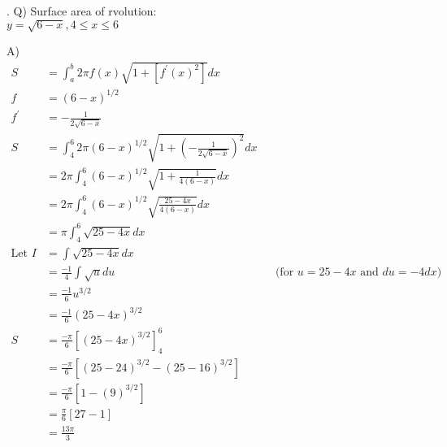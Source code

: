 \documentclass{article}
\newcounter{question}
\begin{document}
\newcommand\Que[1]{%
   \leavevmode\par
   \stepcounter{question}
   \noindent
   \thequestion. Q) #1\par}

\newcommand\Ans[2][]{%
    \leavevmode\par\noindent
   {A) \textbf{#1}#2\par}}

\Que{
    Surface area of rvolution:\\

    $ y = \sqrt{6-x}, 4 \le x \le 6 $\\
    }
\Ans{
    \begin{align*}
        S & = \int_a^b{2\pi f(x) \sqrt{1+[f^{\prime}(x)^2]}} dx\\
        f & = (6-x)^{1/2}\\
        f^{\prime} & = -\frac{1}{2\sqrt{6-x}}\\
        S & = \int_4^6{2\pi 
            (6-x)^{1/2} 
            \sqrt{1+(-\frac{1}{2\sqrt{6-x}})^2}} dx\\
        & = 2\pi \int_4^6{
            (6-x)^{1/2} 
            \sqrt{1+\frac{1}{4(6-x)}}} dx\\
        & = 2\pi \int_4^6{
            (6-x)^{1/2} 
            \sqrt{\frac{25-4x}{4(6-x)}}} dx\\
        & = \pi \int_4^6{ \sqrt{25-4x}} dx\\
        \text{Let } I & = \int{ \sqrt{25-4x} } dx\\
        & = \frac{-1}{4} \int{ \sqrt{u} } du
            && \text{(for $u=25-4x$ and $du=-4dx$)}\\
        & = \frac{-1}{6} u^{3/2}\\
        & = \frac{-1}{6} (25-4x)^{3/2}\\
        S & = \frac{-\pi}{6} \left[
            (25-4x)^{3/2}
        \right ]_4^6\\
        & = \frac{-\pi}{6} \left[
            (25-24)^{3/2} - (25-16)^{3/2}
        \right ]\\
        & = \frac{-\pi}{6} \left[
            1 - (9)^{3/2}
        \right ]\\
        & = \frac{\pi}{6} \left[
            27-1
        \right ]\\
        & = \boxed{\frac{13\pi}{3}}\\
    \end{align*}
}
\end{document}
